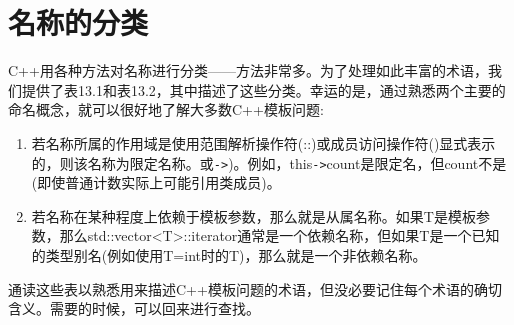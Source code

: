 \section{名称的分类}
C++用各种方法对名称进行分类——方法非常多。为了处理如此丰富的术语，我们提供了表13.1和表13.2，其中描述了这些分类。幸运的是，通过熟悉两个主要的命名概念，就可以很好地了解大多数C++模板问题:

\begin{enumerate}
\item 
若名称所属的作用域是使用范围解析操作符(::)或成员访问操作符()显式表示的，则该名称为限定名称。或\texttt{->})。例如，this\texttt{->}count是限定名，但count不是(即使普通计数实际上可能引用类成员)。

\item 
若名称在某种程度上依赖于模板参数，那么就是从属名称。如果T是模板参数，那么std::vector<T>::iterator通常是一个依赖名称，但如果T是一个已知的类型别名(例如使用T=int时的T)，那么就是一个非依赖名称。
\end{enumerate}

通读这些表以熟悉用来描述C++模板问题的术语，但没必要记住每个术语的确切含义。需要的时候，可以回来进行查找。

